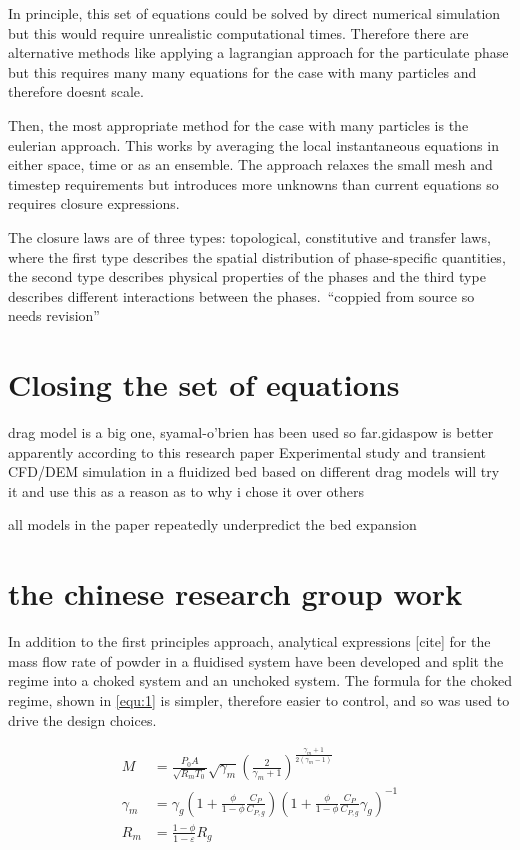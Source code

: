 In principle, this set of equations could be solved by direct numerical simulation but this would require unrealistic computational times. Therefore there are alternative methods like applying a lagrangian approach for the particulate phase but this requires many many equations for the case with many particles and therefore doesnt scale.

Then, the most appropriate method for the case with many particles is the eulerian approach. This works by averaging the local instantaneous equations in either space, time or as an ensemble. The approach relaxes the small mesh and timestep requirements but introduces more unknowns than current equations so requires closure expressions.

The closure laws are of three types: topological, constitutive and transfer laws, where the first type describes the spatial distribution of phase-specific quantities, the second type describes physical properties of the phases and the third type describes different interactions between the phases.~``coppied from source so needs revision''

\newpage
\section{Closing the set of equations}
drag model is a big one, syamal-o'brien has been used so far.gidaspow is better apparently according to this research paper Experimental study and transient CFD/DEM
simulation in a fluidized bed based on different
drag models
will try it and use this as a reason as to why i chose it over others

all models in the paper repeatedly underpredict the bed expansion
\section{the chinese research group work}

In addition to the first principles approach, analytical expressions [cite] for the mass flow rate of powder in a fluidised system have been developed and split the regime into a choked system and an unchoked system. The formula for the choked regime, shown in \autoref{equ:1} is simpler, therefore easier to control, and so was used to drive the design choices.

\begin{align}
    M &= \frac{P_0 A}{\sqrt{R_m T_0}} \sqrt{\gamma_m} {\left( \frac{2}{\gamma_m + 1} \right)}^{\frac{\gamma_m + 1}{2(\gamma_m - 1)}} \\[10pt]
    \gamma_m &= \gamma_g \left( 1 + \frac{\phi}{1 - \phi} \frac{C_P}{C_{P,g}} \right) {\left( 1 + \frac{\phi}{1 - \phi} \frac{C_P}{C_{P,g}} \gamma_g \right)}^{-1} \\[10pt]
    R_m &= \frac{1 - \phi}{1 - \varepsilon} R_g
\end{align}\label{equ:1}
    